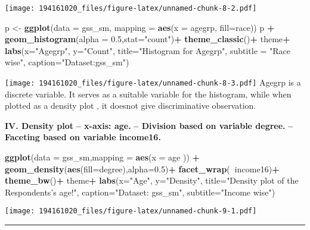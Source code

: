 \documentclass[
]{article}
\newenvironment{Shaded}{\begin{snugshade}}{\end{snugshade}}
\newcommand{\DataTypeTok}[1]{\textcolor[rgb]{0.13,0.29,0.53}{#1}}
\newcommand{\FloatTok}[1]{\textcolor[rgb]{0.00,0.00,0.81}{#1}}
\newcommand{\KeywordTok}[1]{\textcolor[rgb]{0.13,0.29,0.53}{\textbf{#1}}}
\newcommand{\NormalTok}[1]{#1}
\newcommand{\OperatorTok}[1]{\textcolor[rgb]{0.81,0.36,0.00}{\textbf{#1}}}
\newcommand{\StringTok}[1]{\textcolor[rgb]{0.31,0.60,0.02}{#1}}
\begin{document}
\texttt{[image: 194161020\_files/figure-latex/unnamed-chunk-8-2.pdf]}

\begin{Shaded}
\begin{Highlighting}[]
\NormalTok{p <-}\StringTok{ }\KeywordTok{ggplot}\NormalTok{(}\DataTypeTok{data =}\NormalTok{ gss_sm,}
            \DataTypeTok{mapping =} \KeywordTok{aes}\NormalTok{(}\DataTypeTok{x =}\NormalTok{ agegrp, }\DataTypeTok{fill=}\NormalTok{race))}
\NormalTok{p }\OperatorTok{+}\StringTok{ }\KeywordTok{geom_histogram}\NormalTok{(}\DataTypeTok{alpha =} \FloatTok{0.5}\NormalTok{,}\DataTypeTok{stat=}\StringTok{"count"}\NormalTok{)}\OperatorTok{+}
\StringTok{  }\KeywordTok{theme_classic}\NormalTok{()}\OperatorTok{+}
\StringTok{  }\NormalTok{theme}\OperatorTok{+}
\StringTok{  }\KeywordTok{labs}\NormalTok{(}\DataTypeTok{x=}\StringTok{"Agegrp"}\NormalTok{, }\DataTypeTok{y=}\StringTok{"Count"}\NormalTok{, }
       \DataTypeTok{title=}\StringTok{"Histogram for Agegrp"}\NormalTok{, }
       \DataTypeTok{subtitle =} \StringTok{"Race wise"}\NormalTok{, }
       \DataTypeTok{caption=}\StringTok{"Dataset:gss_sm"}\NormalTok{)}
\end{Highlighting}
\end{Shaded}

\texttt{[image: 194161020\_files/figure-latex/unnamed-chunk-8-3.pdf]}
Agegrp is a discrete variable. It serves as a suitable variable for the
histogram, while when plotted as a density plot , it doesnot give
discriminative observation.

\textbf{IV. Density plot} \textbf{-- x-axis: age.} \textbf{-- Division
based on variable degree.} \textbf{-- Faceting based on variable
income16.}

\begin{Shaded}
\begin{Highlighting}[]
\KeywordTok{ggplot}\NormalTok{(}\DataTypeTok{data =}\NormalTok{ gss_sm,}\DataTypeTok{mapping =} \KeywordTok{aes}\NormalTok{(}\DataTypeTok{x =}\NormalTok{ age )) }\OperatorTok{+}\StringTok{ }
\StringTok{  }\KeywordTok{geom_density}\NormalTok{(}\KeywordTok{aes}\NormalTok{(}\DataTypeTok{fill=}\NormalTok{degree),}\DataTypeTok{alpha=}\FloatTok{0.5}\NormalTok{)}\OperatorTok{+}
\StringTok{  }\KeywordTok{facet_wrap}\NormalTok{(}\OperatorTok{~}\NormalTok{income16)}\OperatorTok{+}
\StringTok{  }\KeywordTok{theme_bw}\NormalTok{()}\OperatorTok{+}
\StringTok{  }\NormalTok{theme}\OperatorTok{+}
\StringTok{  }\KeywordTok{labs}\NormalTok{(}\DataTypeTok{x=}\StringTok{"Age"}\NormalTok{, }\DataTypeTok{y=}\StringTok{"Density"}\NormalTok{,}
       \DataTypeTok{title=}\StringTok{"Density plot of the Respondents's age!"}\NormalTok{, }
       \DataTypeTok{caption=}\StringTok{"Dataset: gss_sm"}\NormalTok{, }
       \DataTypeTok{subtitle=}\StringTok{"Income wise"}\NormalTok{)}
\end{Highlighting}
\end{Shaded}

\texttt{[image: 194161020\_files/figure-latex/unnamed-chunk-9-1.pdf]}

\begin{center}\rule{0.5\linewidth}{0.5pt}\end{center}
\end{document}

